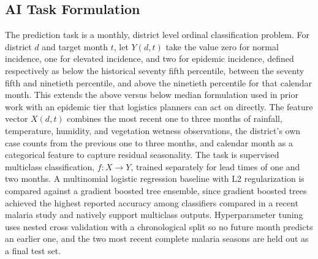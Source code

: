\documentclass[11pt]{article}
\begin{document}
\subsection{AI Task Formulation}
The prediction task is a monthly, district level ordinal classification problem. For district $d$ and target month $t$, let $Y(d,t)$ take the value zero for normal incidence, one for elevated incidence, and two for epidemic incidence, defined respectively as below the historical seventy fifth percentile, between the seventy fifth and ninetieth percentile, and above the ninetieth percentile for that calendar month. This extends the above versus below median formulation used in prior work \cite{martineau2022} with an epidemic tier that logistics planners can act on directly. The feature vector $X(d,t)$ combines the most recent one to three months of rainfall, temperature, humidity, and vegetation wetness observations, the district's own case counts from the previous one to three months, and calendar month as a categorical feature to capture residual seasonality. The task is supervised multiclass classification, $f: X \rightarrow Y$, trained separately for lead times of one and two months. A multinomial logistic regression baseline with L2 regularization is compared against a gradient boosted tree ensemble, since gradient boosted trees achieved the highest reported accuracy among classifiers compared in a recent malaria study \cite{khan2024} and natively support multiclass outputs. Hyperparameter tuning uses nested cross validation with a chronological split so no future month predicts an earlier one, and the two most recent complete malaria seasons are held out as a final test set.
\end{document}
